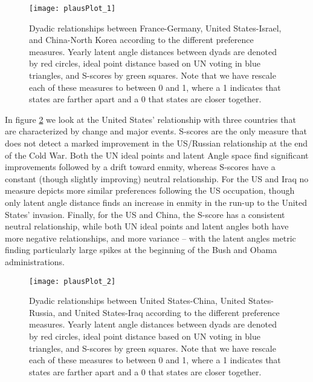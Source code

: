 \begin{figure}
	\centering
	\texttt{[image: plausPlot\_1]}
	\caption{Dyadic relationships between France-Germany, United States-Israel, and China-North Korea according to the different preference measures. Yearly latent angle distances between dyads are denoted by red circles, ideal point distance based on UN voting in blue triangles, and S-scores by green squares. Note that we have rescale each of these measures to between 0 and 1, where a 1 indicates that states are farther apart and a 0 that states are closer together.}
	\label{friendly:dyads}
\end{figure}

In figure \ref{unfriendly:dyads} we look at the United States' relationship with three countries that are characterized by change and major events. S-scores are the only measure that does not detect a marked improvement in the US/Russian relationship at the end of the Cold War. Both the UN ideal points and latent Angle space find significant improvements followed by a drift toward enmity, whereas S-scores have a constant (though slightly improving) neutral relationship. For the US and Iraq no measure depicts more similar preferences following the US occupation, though only latent angle distance finds an increase in enmity in the run-up to the United States' invasion. Finally, for the US and China, the S-score has a consistent neutral relationship, while both UN ideal points and latent angles both have more negative relationships, and more variance -- with the latent angles metric finding particularly large spikes at the beginning of the Bush and Obama administrations.

\begin{figure}
	\centering
	\texttt{[image: plausPlot\_2]}
	\caption{Dyadic relationships between United States-China, United States-Russia, and United States-Iraq according to the different preference measures. Yearly latent angle distances between dyads are denoted by red circles, ideal point distance based on UN voting in blue triangles, and S-scores by green squares. Note that we have rescale each of these measures to between 0 and 1, where a 1 indicates that states are farther apart and a 0 that states are closer together.}
	\label{unfriendly:dyads}
\end{figure}


